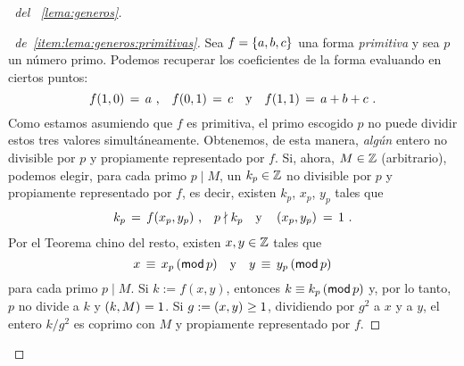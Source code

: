 \begin{proof}[\proofname~del \lemaname~\ref{lema:generos}]
	\begin{proof}[\proofname~de~\ref{item:lema:generos:primitivas}]
		Sea $f=\binaria{a,b,c}$ una forma \emph{primitiva}
		y sea $p$ un n\'umero primo. Podemos recuperar los
		coeficientes de la forma evaluando en ciertos puntos:
		\begin{displaymath}
			f(1,0)\,=\,a\dispcomma\quad
			f(0,1)\,=\,c\dispand
			f(1,1)\,=\,a+b+c
			\dispstop
		\end{displaymath}
		Como estamos asumiendo que $f$ es primitiva, el primo
		escogido $p$ no puede dividir estos tres valores
		simult\'aneamente. Obtenemos, de esta manera,
		\emph{alg\'un} entero no divisible por $p$ y propiamente
		representado por $f$.
		Si, ahora, $M\in\Enteros$ (arbitrario), podemos elegir,
		para cada primo $p\mid M$, un $k_p\in\Enteros$ no divisible
		por $p$ y propiamente representado por $f$, es decir,
		existen $k_p$, $x_p$, $y_p$ tales que
		\begin{displaymath}
			k_p\,=\,f(x_p,y_p)\dispcomma\quad
			p\nmid k_p\dispand
			\mcd{x_p,y_p}\,=\,1
			\dispstop
		\end{displaymath}
		Por el Teorema chino del resto, existen $x,y\in\Enteros$
		tales que
		\begin{displaymath}
			x\,\equiv\,x_p\tmodulo[p]
			\dispand
			y\,\equiv\,y_p\tmodulo[p]
		\end{displaymath}
		para cada primo $p\mid M$. Si $k:=f(x,y)$, entonces
		$k\equiv k_p\tmodulo[p]$ y, por lo tanto,
		$p$ no divide a $k$ y $\mcd{k,M}=1$.
		Si $g:=\mcd{x,y}\geq 1$, dividiendo por $g^2$ a $x$ y a $y$,
		el entero $k/g^2$ es coprimo con $M$ y propiamente
		representado por $f$.
	\end{proof}


\end{proof}
